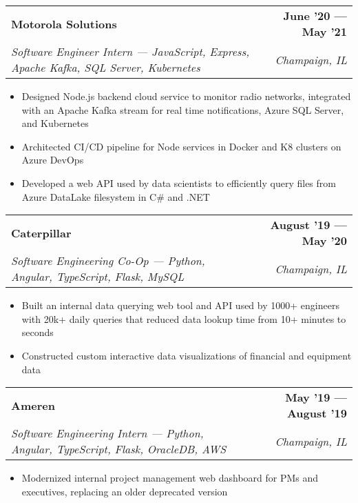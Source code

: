 \documentclass[letterpaper,11pt]{article}
\makeatletter
\newcommand{\resumeItem}[1]{
  \item\small{
    {#1 \vspace{-1pt}}
  }
}
\newcommand{\resumeSubheadingSmall}[4]{
  \vspace{-0pt}
  \item
    \begin{tabular*}{1\textwidth}[t]{l@{\extracolsep{\fill}}r}
      \large{\textbf{#1}} & \small{\color{main}\textbf{#2}} \\
      \textit{\footnotesize#3} & \textit{\footnotesize#4} \\
    \end{tabular*}\vspace{-7pt}
}
\newcommand{\resumeSubSubheading}[2]{
    \item
    \begin{tabular*}{0.97\textwidth}{l@{\extracolsep{\fill}}r}
      \textit{\small#1} & \textit{\small #2} \\
    \end{tabular*}\vspace{-7pt}
}
\newcommand{\resumeSubHeadingListEnd}{\end{itemize}}
\newcommand{\resumeItemListStart}{\begin{itemize}}
\newcommand{\resumeItemListEnd}{\end{itemize}\vspace{0pt}}
\makeatother
\begin{document}

    \resumeSubheadingSmall
      {Motorola Solutions} %
      {June '20 --- May '21} %
      {Software Engineer Intern --- JavaScript, Express, Apache Kafka, SQL Server, Kubernetes} %
      {Champaign, IL} %
      \resumeItemListStart
        \resumeItem{Designed Node.js backend cloud service to monitor radio networks, integrated with an Apache Kafka stream for real time notifications, Azure SQL Server, and Kubernetes }
        \resumeItem{Architected CI/CD pipeline for Node services in Docker and K8 clusters on Azure DevOps}
        \resumeItem{Developed a web API used by data scientists to efficiently query files from Azure DataLake filesystem in C\# and .NET}
    \resumeItemListEnd

    \resumeSubheadingSmall
      {Caterpillar} %
      {August '19 --- May '20} %
      {Software Engineering Co-Op --- Python, Angular, TypeScript, Flask, MySQL} %
      {Champaign, IL} %
      \resumeItemListStart
        \resumeItem{Built an internal data querying web tool and API used by 1000+ engineers with 20k+ daily queries that reduced data lookup time from 10+ minutes to seconds}
        \resumeItem{Constructed custom interactive data visualizations of financial and equipment data}
      \resumeItemListEnd

    \resumeSubheadingSmall
      {Ameren} %
      {May '19 --- August '19} %
      {Software Engineering Intern --- Python, Angular, TypeScript, Flask, OracleDB, AWS} %
      {Champaign, IL} %
      \resumeItemListStart
        \resumeItem{Modernized internal project management web dashboard for PMs and executives, replacing an older deprecated version}
      \resumeItemListEnd
\end{document}
